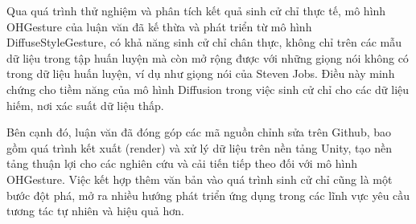 Qua quá trình thử nghiệm và phân tích kết quả sinh cử chỉ thực tế, mô hình OHGesture của luận văn đã kế thừa và phát triển từ mô hình DiffuseStyleGesture, có khả năng sinh cử chỉ chân thực, không chỉ trên các mẫu dữ liệu trong tập huấn luyện mà còn mở rộng được với những giọng nói không có trong dữ liệu huấn luyện, ví dụ như giọng nói của Steven Jobs. Điều này minh chứng cho tiềm năng của mô hình Diffusion trong việc sinh cử chỉ cho các dữ liệu hiếm, nơi xác suất dữ liệu thấp.

Bên cạnh đó, luận văn đã đóng góp các mã nguồn chỉnh sửa trên Github, bao gồm quá trình kết xuất (render) và xử lý dữ liệu trên nền tảng Unity, tạo nền tảng thuận lợi cho các nghiên cứu và cải tiến tiếp theo đối với mô hình OHGesture. Việc kết hợp thêm văn bản vào quá trình sinh cử chỉ cũng là một bước đột phá, mở ra nhiều hướng phát triển ứng dụng trong các lĩnh vực yêu cầu tương tác tự nhiên và hiệu quả hơn.


%
%



%

